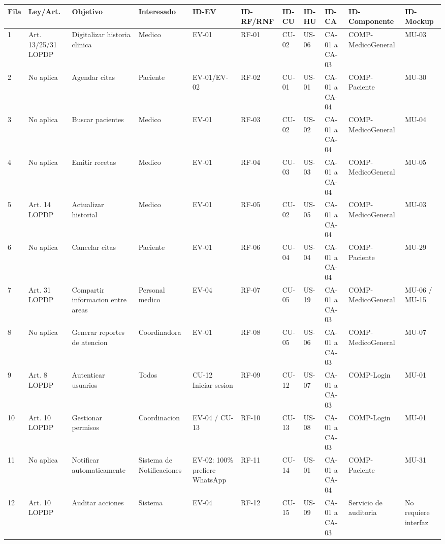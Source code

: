\documentclass[11pt,a4paper]{article}
\begin{document}
	\begingroup
	\scriptsize
	\setlength{\LTleft}{-1.5cm}
	\setlength{\LTright}{0pt}
	\begin{longtable}{p{} p{} p{} p{} p{} p{} p{} p{} p{} p{} p{}}
		\toprule
		\textbf{Fila} & \textbf{Ley/Art.} & \textbf{Objetivo} & \textbf{Interesado} & \textbf{ID-EV} & \textbf{ID-RF/RNF} & \textbf{ID-CU} & \textbf{ID-HU} & \textbf{ID-CA} & \textbf{ID-Componente} & \textbf{ID-Mockup}\\
		\midrule\endhead
		1 & Art. 13/25/31 LOPDP & Digitalizar historia clinica & Medico & EV-01 & RF-01 & CU-02 & US-06 & CA-01 a CA-03 & COMP-MedicoGeneral & MU-03 \\
		2 & No aplica & Agendar citas & Paciente & EV-01/EV-02 & RF-02 & CU-01 & US-01 & CA-01 a CA-04 & COMP-Paciente & MU-30 \\
		3 & No aplica & Buscar pacientes & Medico & EV-01 & RF-03 & CU-02 & US-02 & CA-01 a CA-04 & COMP-MedicoGeneral & MU-04 \\
		4 & No aplica & Emitir recetas & Medico & EV-01 & RF-04 & CU-03 & US-03 & CA-01 a CA-04 & COMP-MedicoGeneral & MU-05 \\
		5 & Art. 14 LOPDP & Actualizar historial & Medico & EV-01 & RF-05 & CU-02 & US-05 & CA-01 a CA-04 & COMP-MedicoGeneral & MU-03 \\
		6 & No aplica & Cancelar citas & Paciente & EV-01 & RF-06 & CU-04 & US-04 & CA-01 a CA-04 & COMP-Paciente & MU-29 \\
		7 & Art. 31 LOPDP & Compartir informacion entre areas & Personal medico & EV-04 & RF-07 & CU-05 & US-19 & CA-01 a CA-03 & COMP-MedicoGeneral & MU-06 / MU-15 \\
		8 & No aplica & Generar reportes de atencion & Coordinadora & EV-01 & RF-08 & CU-05 & US-06 & CA-01 a CA-03 & COMP-MedicoGeneral & MU-07 \\
		9 & Art. 8 LOPDP & Autenticar usuarios & Todos & CU-12 Iniciar sesion & RF-09 & CU-12 & US-07 & CA-01 a CA-03 & COMP-Login & MU-01 \\
		10 & Art. 10 LOPDP & Gestionar permisos & Coordinacion & EV-04 / CU-13 & RF-10 & CU-13 & US-08 & CA-01 a CA-03 & COMP-Login & MU-01 \\
		11 & No aplica & Notificar automaticamente & Sistema de Notificaciones & EV-02: 100\% prefiere WhatsApp & RF-11 & CU-14 & US-01 & CA-01 a CA-04 & COMP-Paciente & MU-31 \\
		12 & Art. 10 LOPDP & Auditar acciones & Sistema & EV-04 & RF-12 & CU-15 & US-09 & CA-01 a CA-03 & Servicio de auditoria & No requiere interfaz \\

\end{longtable}
\end{document}
